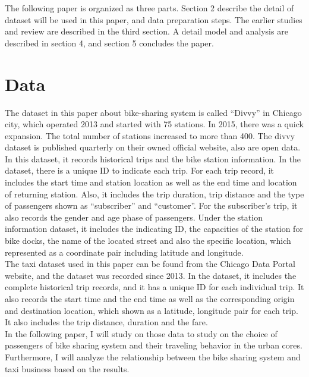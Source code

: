 \documentclass{article}
\begin{document}
    The following paper is organized as three parts. Section 2 describe the detail of dataset will be used in this paper, and data preparation steps. The earlier studies and review are described in the third section. A detail model and analysis are described in section 4, and section 5 concludes the 
    paper.
    
    \section{Data}
    The dataset in this paper about bike-sharing system is called “Divvy” in Chicago city, which operated 2013 and started with 75 stations. In 2015, there was a quick expansion. The total number of stations increased to more than 400. The divvy dataset is published quarterly on their owned official website, also are open data. In this dataset, it records historical trips and the bike station information. In the dataset, there is a unique ID to indicate each trip. For each trip record, it includes the start time and station location as well as the end time and location of returning station. Also, it includes the trip duration, trip distance and the type of passengers shown as “subscriber” and “customer”. For the subscriber’s trip, it also records the gender and age phase of passengers. Under the station information dataset, it includes the indicating ID, the capacities of the station for bike docks, the name of the located street and also the specific location, which represented as a coordinate pair including latitude and longitude. \\
	The taxi dataset used in this paper can be found from the Chicago Data Portal website, and the dataset was recorded since 2013. In the dataset, it includes the complete historical trip records, and it has a unique ID for each individual trip. It also records the start time and the end time as well as the corresponding origin and destination location, which shown as a latitude, longitude pair for each trip. It also includes the trip distance, duration and the fare.\\
	In the following paper, I will study on those data to study on the choice of passengers of bike sharing system and their traveling behavior in the urban cores. Furthermore, I will analyze the relationship between the bike sharing system and taxi business based on the results.
	
\end{document}
